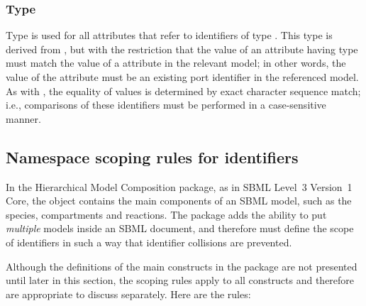 \subsubsection{Type \hspace*{1pt}}
\label{primtype-portidref}

Type  is used for all attributes that refer to
identifiers of type .  This type is derived from
, but with the restriction that the value of an
attribute having type  must match the value of a
 attribute in the relevant model;  in other words, the value of
the attribute must be an existing port identifier in
the referenced model.  As with , the equality of
 values is determined by exact character sequence
match; i.e., comparisons of these identifiers must be performed in a
case-sensitive manner.


\subsection{Namespace scoping rules for identifiers}
\label{namespaces}

In the Hierarchical Model Composition package, as in SBML Level~3
Version~1 Core, the \Model object contains the main components of an
SBML model, such as the species, compartments and reactions.  The package adds the
ability to put \emph{multiple} models inside an SBML document, and therefore must define the scope of
identifiers in such a way that identifier collisions are prevented.

Although the definitions of the main constructs in the package are not
presented until later in this section, the scoping rules apply to all
constructs and therefore are appropriate to discuss separately.  Here
are the rules:

